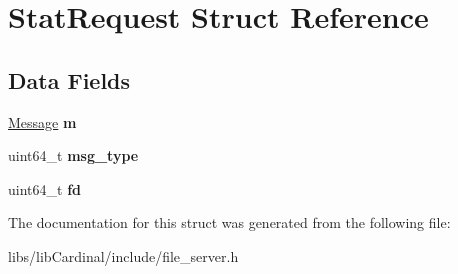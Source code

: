 \hypertarget{structStatRequest}{}\section{Stat\+Request Struct Reference}
\label{structStatRequest}
\subsection*{Data Fields}
\begin{DoxyCompactItemize}
\item 
\hyperlink{structMessage}{Message} {\bfseries m}\hypertarget{structStatRequest_a54b45a0494a421b11b6bedaaa4274219}{}\label{structStatRequest_a54b45a0494a421b11b6bedaaa4274219}

\item 
uint64\+\_\+t {\bfseries msg\+\_\+type}\hypertarget{structStatRequest_a7216fb0885adc0fe562f23747d7bf0d1}{}\label{structStatRequest_a7216fb0885adc0fe562f23747d7bf0d1}

\item 
uint64\+\_\+t {\bfseries fd}\hypertarget{structStatRequest_a2bd7880b3398a7659594f4f6e175a3f3}{}\label{structStatRequest_a2bd7880b3398a7659594f4f6e175a3f3}

\end{DoxyCompactItemize}


The documentation for this struct was generated from the following file\+:\begin{DoxyCompactItemize}
\item 
libs/lib\+Cardinal/include/file\+\_\+server.\+h\end{DoxyCompactItemize}
